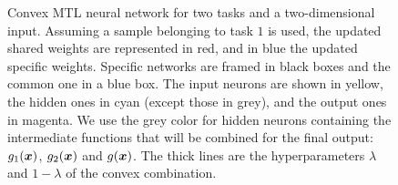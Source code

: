 \begin{figure}[t!]
    \caption{Convex MTL neural network for two tasks and a two-dimensional input.
    Assuming a sample belonging to task $1$ is used, the updated shared weights are represented in red, and in blue the updated specific weights. 
    Specific networks are framed in black boxes and the common one in a blue box.
    The input neurons are shown in yellow, the hidden ones in cyan (except those in grey), and the output ones in magenta. 
    We use the grey color for hidden neurons containing the intermediate functions that will be combined for the final output: $g_1(\bm{x})$, $g_2(\bm{x})$ and $g(\bm{x})$.
    The thick lines are the hyperparameters $\lambda$ and $1-\lambda$ of the convex combination. 
	}
    \label{fig:convexmtl_nn}
\end{figure}
